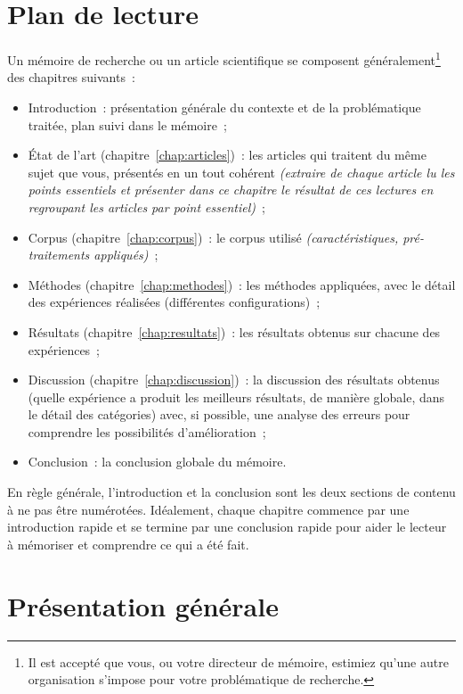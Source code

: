 \documentclass[a4paper,11pt,twoside]{memoir}
\begin{document}
\section*{Plan de lecture}
Un mémoire de recherche ou un article scientifique se composent
généralement\footnote{Il est accepté que vous, ou votre directeur de
	mémoire, estimiez qu'une autre organisation s'impose pour votre
	problématique de recherche.} des chapitres suivants~:
%
\begin{itemize}
	\item Introduction~: présentation générale du contexte et de la
	problématique traitée, plan suivi dans le mémoire~;
	\item \'Etat de l'art (chapitre~\ref{chap:articles})~: les articles
	qui traitent du même sujet que vous, présentés en un tout cohérent
	\emph{(extraire de chaque article lu les points essentiels et
		présenter dans ce chapitre le résultat de ces lectures en
		regroupant les articles par point essentiel)}~;
	\item Corpus (chapitre~\ref{chap:corpus})~: le corpus utilisé
	\emph{(caractéristiques, pré-traitements appliqués)}~;
	\item Méthodes (chapitre~\ref{chap:methodes})~: les méthodes
	appliquées, avec le détail des expériences réalisées (différentes
	configurations)~;
	\item Résultats (chapitre~\ref{chap:resultats})~: les résultats
	obtenus sur chacune des expériences~;
	\item Discussion (chapitre~\ref{chap:discussion})~: la discussion des
	résultats obtenus (quelle expérience a produit les meilleurs
	résultats, de manière globale, dans le détail des catégories) avec,
	si possible, une analyse des erreurs pour comprendre les
	possibilités d'amélioration~;
	\item Conclusion~: la conclusion globale du mémoire.
\end{itemize}

En règle générale, l'introduction et la conclusion sont les deux
sections de contenu à ne pas être numérotées. Idéalement, chaque
chapitre commence par une introduction rapide et se termine par une
conclusion rapide pour aider le lecteur à mémoriser et comprendre ce
qui a été fait.\newpage

\section*{Pr\'esentation g\'en\'erale}
\end{document}
